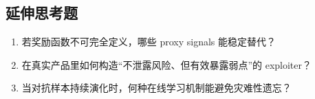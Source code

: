 \subsection*{延伸思考题}
\begin{enumerate}
    \item 若奖励函数不可完全定义，哪些 proxy signals 能稳定替代？
    \item 在真实产品里如何构造``不泄露风险、但有效暴露弱点''的 exploiter？
    \item 当对抗样本持续演化时，何种在线学习机制能避免灾难性遗忘？
\end{enumerate}


